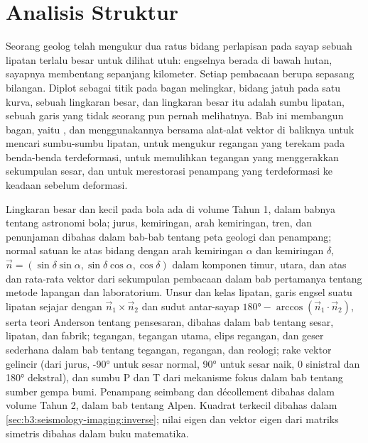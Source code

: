 \chapter{Analisis Struktur}\label{ch:b3:structural-analysis}

Seorang geolog telah mengukur dua ratus bidang perlapisan pada sayap sebuah lipatan
terlalu besar untuk dilihat utuh: engselnya berada di bawah hutan, sayapnya membentang sepanjang
kilometer. Setiap pembacaan berupa sepasang bilangan. Diplot sebagai titik pada
bagan melingkar,  bidang jatuh pada satu kurva, sebuah lingkaran besar, dan
 lingkaran besar itu adalah sumbu lipatan, sebuah garis yang tidak seorang pun
pernah melihatnya. Bab ini membangun bagan, yaitu , dan
menggunakannya bersama alat-alat vektor di baliknya untuk mencari sumbu-sumbu lipatan, untuk mengukur
regangan yang terekam pada benda-benda terdeformasi, untuk memulihkan tegangan yang menggerakkan sekumpulan
sesar, dan untuk merestorasi penampang yang terdeformasi ke keadaan sebelum
deformasi.

\begin{recall}
Lingkaran besar dan kecil pada bola ada di volume Tahun 1, dalam babnya
tentang astronomi bola; jurus, kemiringan, arah kemiringan, tren, dan penunjaman
dibahas dalam bab-bab tentang peta geologi dan penampang;
normal satuan ke atas bidang dengan arah kemiringan $\alpha$ dan kemiringan $\delta$, $\vec n = (\sin\delta
\sin\alpha, \sin\delta\cos\alpha, \cos\delta)$ dalam komponen timur, utara, dan atas
dan rata-rata vektor dari sekumpulan pembacaan dalam bab pertamanya tentang
metode lapangan dan laboratorium. Unsur dan kelas lipatan, garis engsel suatu
lipatan sejajar dengan $\vec n_1\times\vec n_2$ dan sudut antar-sayap
$\ang{180} - \arccos(\vec n_1\cdot\vec n_2)$, serta teori Anderson tentang
pensesaran, dibahas dalam bab tentang sesar, lipatan, dan fabrik; tegangan,
tegangan utama, elips regangan, dan geser sederhana dalam bab tentang
tegangan, regangan, dan reologi; rake vektor gelincir (dari jurus,
\ang{-90} untuk sesar normal, \ang{90} untuk sesar naik, 0 sinistral dan
\ang{180} dekstral), dan sumbu P dan T dari mekanisme fokus dalam bab tentang
sumber gempa bumi. Penampang seimbang dan décollement dibahas dalam
volume Tahun 2, dalam bab tentang Alpen. Kuadrat terkecil dibahas dalam
\cref{sec:b3:seismology-imaging:inverse}; nilai eigen dan vektor eigen dari
matriks simetris dibahas dalam buku matematika.
\end{recall}

